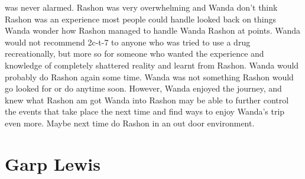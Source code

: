\documentclass[12pt]{book}
\begin{document}
was never alarmed. Rashon was very overwhelming and Wanda don't think Rashon was an experience most people could handle looked back on things Wanda wonder how Rashon managed to handle Wanda Rashon at points. Wanda would not recommend 2c-t-7 to anyone who was tried to use a drug recreationally, but more so for someone who wanted the experience and knowledge of completely shattered reality and learnt from Rashon. Wanda would probably do Rashon again some time. Wanda was not something Rashon would go looked for or do anytime soon. However, Wanda enjoyed the journey, and knew what Rashon am got Wanda into Rashon may be able to further control the events that take place the next time and find ways to enjoy Wanda's trip even more. Maybe next time do Rashon in an out door environment.



\chapter{Garp Lewis}
\end{document}
